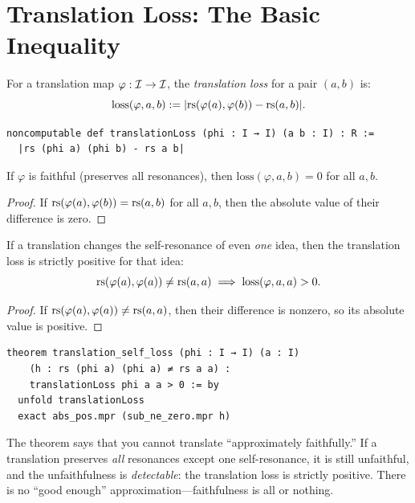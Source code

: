 \section{Translation Loss: The Basic Inequality}

\begin{definition}
For a translation map $\varphi : \mathcal{I} \to \mathcal{I}$, the \emph{translation
loss} for a pair $(a, b)$ is:
\[
  \mathrm{loss}(\varphi, a, b) := |\mathrm{rs}(\varphi(a), \varphi(b)) - \mathrm{rs}(a, b)|.
\]
\end{definition}

\begin{lstlisting}
noncomputable def translationLoss (phi : I → I) (a b : I) : R :=
  |rs (phi a) (phi b) - rs a b|
\end{lstlisting}

\begin{theorem}
\label{thm:faithful-zero}
If $\varphi$ is faithful (preserves all resonances), then
$\mathrm{loss}(\varphi, a, b) = 0$ for all $a, b$.
\end{theorem}

\begin{proof}
If $\mathrm{rs}(\varphi(a), \varphi(b)) = \mathrm{rs}(a, b)$ for all $a, b$,
then the absolute value of their difference is zero.
\end{proof}

\begin{theorem}
\label{thm:self-distortion}
If a translation changes the self-resonance of even \emph{one} idea,
then the translation loss is strictly positive for that idea:
\[
  \mathrm{rs}(\varphi(a), \varphi(a)) \neq \mathrm{rs}(a, a)
  \implies
  \mathrm{loss}(\varphi, a, a) > 0.
\]
\end{theorem}

\begin{proof}
If $\mathrm{rs}(\varphi(a), \varphi(a)) \neq \mathrm{rs}(a, a)$, then their difference
is nonzero, so its absolute value is positive.
\end{proof}

\begin{lstlisting}
theorem translation_self_loss (phi : I → I) (a : I)
    (h : rs (phi a) (phi a) ≠ rs a a) :
    translationLoss phi a a > 0 := by
  unfold translationLoss
  exact abs_pos.mpr (sub_ne_zero.mpr h)
\end{lstlisting}

\begin{remark}
The theorem says that you cannot translate ``approximately faithfully.''
If a translation preserves \emph{all} resonances except one self-resonance,
it is still unfaithful, and the unfaithfulness is \emph{detectable}:
the translation loss is strictly positive.  There is no ``good enough''
approximation---faithfulness is all or nothing.
\end{remark}

